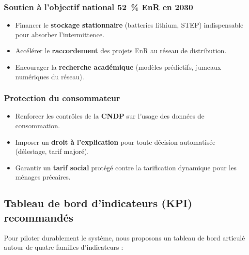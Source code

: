 \documentclass[11pt,a4paper]{article}
\begin{document}
\subsubsection{Soutien à l'objectif national 52~\% EnR en 2030}
\begin{itemize}
  \item Financer le \textbf{stockage stationnaire} (batteries lithium, STEP) indispensable pour absorber l'intermittence.
  \item Accélérer le \textbf{raccordement} des projets EnR au réseau de distribution.
  \item Encourager la \textbf{recherche académique} (modèles prédictifs, jumeaux numériques du réseau).
\end{itemize}

\subsubsection{Protection du consommateur}
\begin{itemize}
  \item Renforcer les contrôles de la \textbf{CNDP} sur l'usage des données de consommation.
  \item Imposer un \textbf{droit à l'explication} pour toute décision automatisée (délestage, tarif majoré).
  \item Garantir un \textbf{tarif social} protégé contre la tarification dynamique pour les ménages précaires.
\end{itemize}

\subsection{Tableau de bord d'indicateurs (KPI) recommandés}

Pour piloter durablement le système, nous proposons un tableau de bord articulé autour de quatre familles d'indicateurs :
\end{document}
